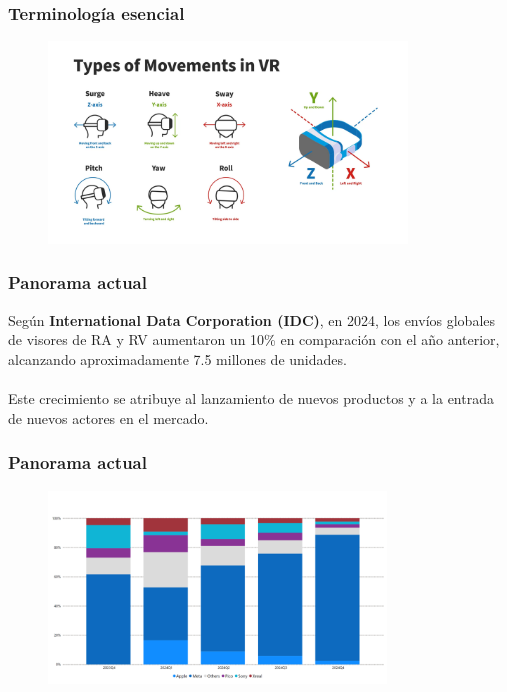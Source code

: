 \documentclass[aspectratio=169,17pt]{beamer}
\begin{document}
    \begin{frame}
        \frametitle{Terminología esencial}
            \begin{figure}
                \centering
                \includegraphics[width=0.85\textwidth]{Ilustración 4.png}
                \label{Ilu4}
            \end{figure}
    \end{frame}

    \begin{frame}
        \frametitle{Panorama actual}
            Según \textbf{International Data Corporation (IDC)}, en 2024, los envíos globales de visores de RA y RV aumentaron un 10\% en comparación con el año anterior, alcanzando aproximadamente 7.5 millones de unidades.\\
            ­\\
            Este crecimiento se atribuye al lanzamiento de nuevos productos y a la entrada de nuevos actores en el mercado.
    \end{frame}

    \begin{frame}
        \frametitle{Panorama actual}
            \begin{figure}
                \centering
                \includegraphics[width=0.8\textwidth]{Gráfica 2.png}
                \label{Gra2}
            \end{figure}
    \end{frame}
\end{document}
